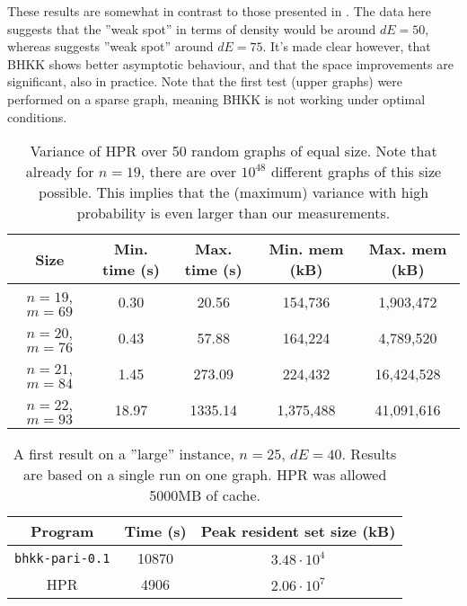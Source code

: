 \documentclass[a4paper]{article}
\newcommand{\code}{\texttt}
\begin{document}
These results are somewhat in contrast to those presented in \cite{haggard}. The data here suggests that the ''weak spot'' in terms of density would be around $dE = 50$, whereas \cite{haggard} suggests ''weak spot'' around $dE = 75$. It's made clear however, that BHKK shows better asymptotic behaviour, and that the space improvements are significant, also in practice. Note that the first test (upper graphs) were performed on a sparse graph, meaning BHKK is not working under optimal conditions.

\begin{table}[H]\centering
 \begin{tabular}{ccccc} \hline
  Size 			& Min. time (s)	& Max. time (s)	& Min. mem (kB)	& Max. mem (kB) \\ \hline
  $n = 19$, $m = 69$ 	& 0.30 		& 20.56		& 154,736	& 1,903,472\\ \hline
  $n = 20$, $m = 76$ 	& 0.43 		& 57.88		& 164,224	& 4,789,520 \\ \hline
  $n = 21$, $m = 84$ 	& 1.45 		& 273.09	& 224,432	& 16,424,528 \\ \hline
  $n = 22$, $m = 93$ 	& 18.97		& 1335.14	& 1,375,488	& 41,091,616 \\ \hline
 \end{tabular}
 \caption{Variance of HPR over 50 random graphs of equal size. Note that already for $n = 19$, there are over $10^{48}$ different graphs of this size possible. This implies that the (maximum) variance with high probability is even larger than our measurements.}
 \label{variance}
\end{table}

\begin{table}[H]\centering
 \begin{tabular}{|c|c|c|} \hline
  Program & Time (s) & Peak resident set size (kB) \\ \hline
  \code{bhkk-pari-0.1} & 10870 & $3.48 \cdot 10^{4}$ \\ \hline
  HPR & 4906 & $2.06 \cdot 10^{7}$ \\ \hline
 \end{tabular}
 \caption{A first result on a ''large'' instance, $n = 25$, $dE = 40$. Results are based on a single run on one graph. HPR was allowed 5000MB of cache.}
\end{table}
\end{document}
